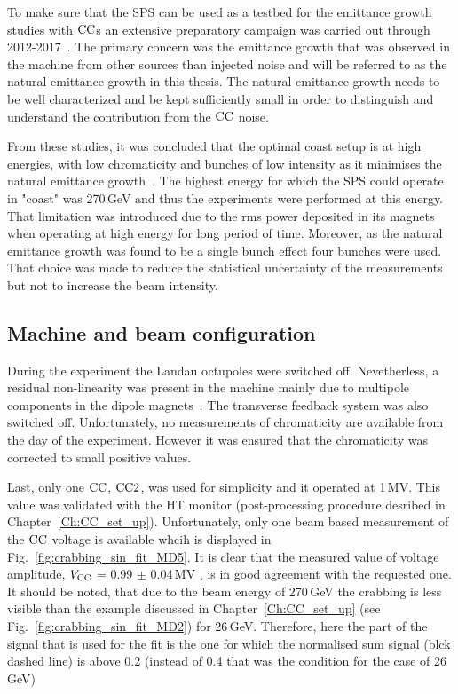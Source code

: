 To make sure that the SPS can be used as a testbed for the emittance growth studies with ${\mathrm{CC}}$s an extensive preparatory campaign was carried out through 2012-2017~\cite{Calaga:1451286, Alekou_CC_coast_prep_2016, Antoniou:2649815}. The primary concern was the emittance growth that was observed in the machine from other sources than injected noise and will be referred to as the natural emittance growth in this thesis. The natural emittance growth needs to be well characterized and be kept sufficiently small in order to distinguish and understand the contribution from the ${\mathrm{CC}}$ noise. 

From these studies, it was concluded that the optimal coast setup is at high energies, with low chromaticity and bunches of low intensity as it minimises the natural emittance growth~\cite{Antoniou:2649815}. The highest energy for which the SPS could operate in "coast" was 270\,GeV and thus the experiments were performed at this energy. That limitation was introduced due to the rms power deposited in its magnets when operating at high energy for long period of time. Moreover, as the natural emittance growth was found to be a single bunch effect four bunches were used. That choice was made to reduce the statistical uncertainty of the measurements but not to increase the beam intensity.

\subsection{Machine and beam configuration}
During the experiment the Landau octupoles were switched off. Nevetherless, a residual non-linearity was present in the machine mainly due to multipole components in the dipole magnets~\cite{Carlà:2664976, Alekou:2640326}. The transverse feedback system was also switched off. Unfortunately, no measurements of chromaticity are available from the day of the experiment. However it was ensured that the chromaticity was corrected to small positive values. 

Last, only one ${\mathrm{CC}}$, ${\mathrm{CC}} 2$, was used for simplicity and it operated at 1\,MV. This value was validated with the HT monitor (post-processing procedure desribed in Chapter~\ref{Ch:CC_set_up}). Unfortunately, only one beam based measurement of the ${\mathrm{CC}}$ voltage is available whcih is displayed in Fig.~\ref{fig:crabbing_sin_fit_MD5}. It is clear that the measured value of voltage amplitude, ${V_\mathrm{CC}}$ = 0.99 $\pm$ 0.04\,MV , is in good agreement with the requested one. It should be noted, that due to the beam energy of 270\,GeV the crabbing is less visible than the example discussed in Chapter~\ref{Ch:CC_set_up} (see Fig.~\ref{fig:crabbing_sin_fit_MD2}) for 26\,GeV. Therefore, here the part of the signal that is used for the fit is the one for which the normalised sum signal (blck dashed line) is above 0.2 (instead of 0.4 that was the condition for the case of 26\,GeV)

